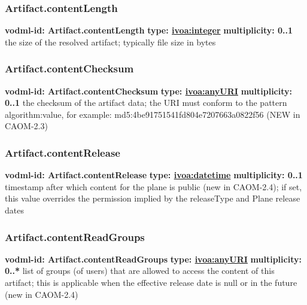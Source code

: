     \subsubsection{Artifact.contentLength}
      \textbf{vodml-id: Artifact.contentLength} \newline
      \textbf{type: \hyperref[sect:ivoa]{ivoa:integer}} \newline
      \textbf{multiplicity: 0..1} \newline
      the size of the resolved artifact; typically file size in bytes

    \subsubsection{Artifact.contentChecksum}
      \textbf{vodml-id: Artifact.contentChecksum} \newline
      \textbf{type: \hyperref[sect:ivoa]{ivoa:anyURI}} \newline
      \textbf{multiplicity: 0..1} \newline
      the checksum of the artifact data; the URI must conform to the pattern {algorithm}:{value}, for example: md5:4be91751541fd804e7207663a0822f56 (NEW in CAOM-2.3)

    \subsubsection{Artifact.contentRelease}
      \textbf{vodml-id: Artifact.contentRelease} \newline
      \textbf{type: \hyperref[sect:ivoa]{ivoa:datetime}} \newline
      \textbf{multiplicity: 0..1} \newline
      timestamp after which content for the plane is public (new in CAOM-2.4); if set, this value overrides the permission implied by the releaseType and Plane release dates

    \subsubsection{Artifact.contentReadGroups}
      \textbf{vodml-id: Artifact.contentReadGroups} \newline
      \textbf{type: \hyperref[sect:ivoa]{ivoa:anyURI}} \newline
      \textbf{multiplicity: 0..*} \newline
      list of groups (of users) that are allowed to access the content of this artifact; this is applicable when the effective release date is null or in the future (new in CAOM-2.4)

